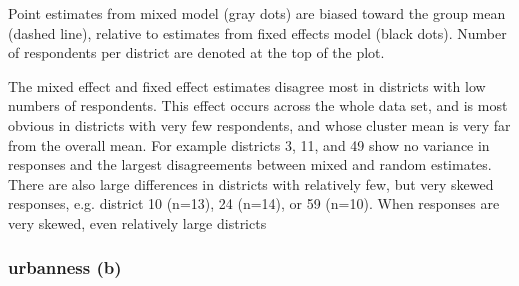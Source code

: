 \documentclass{article}
\begin{document}
Point estimates from mixed model (gray dots) are biased toward the group mean (dashed line), relative to estimates from fixed effects model (black dots).
Number of respondents per district are denoted at the top of the plot. 


The mixed effect and fixed effect estimates disagree most in districts with low numbers of respondents. 
This effect occurs across the whole data set, and is most obvious in districts with very few respondents, and whose cluster mean is very far from the overall mean. 
For example districts 3, 11, and 49 show no variance in responses and the largest disagreements between mixed and random estimates. 
There are also large differences in districts with relatively few, but very skewed responses, e.g. district 10 (n=13), 24 (n=14), or 59 (n=10).
When responses are very skewed, even relatively large districts 



\subsubsection*{urbanness (b)}
\end{document}
